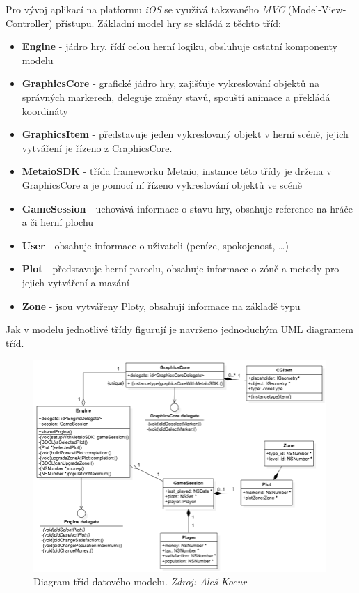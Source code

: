 \documentclass[twoside,12pt]{article}
\begin{document}
Pro vývoj aplikací na platformu \textit{iOS} se využívá takzvaného \textit{MVC} (Model-View-Controller) přístupu. Základní model hry se skládá z těchto tříd:

\begin{itemize}
	\item \textbf{Engine} - jádro hry, řídí celou herní logiku, obsluhuje ostatní komponenty modelu
	\item \textbf{GraphicsCore} - grafické jádro hry, zajišťuje vykreslování objektů na správných markerech, deleguje změny stavů, spouští animace a překládá koordináty
	\item \textbf{GraphicsItem} - představuje jeden vykreslovaný objekt v herní scéně, jejich vytváření je řízeno z CraphicsCore.
	\item \textbf{MetaioSDK} - třída frameworku Metaio, instance této třídy je držena v GraphicsCore a je pomocí ní řízeno vykreslování objektů ve scéně
	\item \textbf{GameSession} - uchovává informace o stavu hry, obsahuje reference na hráče a či herní plochu
	\item \textbf{User} - obsahuje informace o uživateli (peníze, spokojenost, \dots)
	\item \textbf{Plot} - představuje herní parcelu, obsahuje informace o zóně a metody pro jejich vytváření a mazání
	\item \textbf{Zone} - jsou vytvářeny Ploty, obsahují informace na základě typu
\end{itemize}

Jak v modelu jednotlivé třídy figurují je navrženo jednoduchým UML diagramem tříd.

\begin{figure}[H]
\centering
    \includegraphics[width=420px, center]{images/model.png}
\captionsetup{justification=centering}
    \caption[]{Diagram tříd datového modelu. \textit{Zdroj: Aleš Kocur}}
    \label{class_diagram}
\end{figure}
\end{document}
